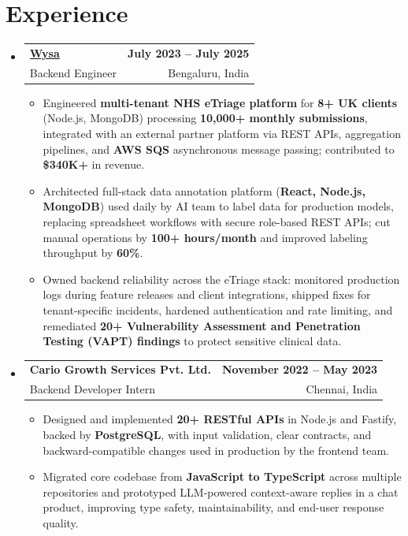 \documentclass[letterpaper,10pt]{article}
\makeatletter
\newcommand{\resumeItem}[1]{
  \item\small{#1\vspace{-1pt}}
}
\newcommand{\resumeSubheading}[4]{
  \vspace{1pt}\item
    \begin{tabular*}{0.985\textwidth}[t]{l@{\extracolsep{\fill}}r}
      \textbf{#1} & \textbf{\small #2} \\
      {\small\color{ResumeSlate} #3} & {\small\color{ResumeSlate} #4} \\
    \end{tabular*}\vspace{-6pt}
}
\newcommand{\resumeSubHeadingListStart}{\begin{itemize}[leftmargin=0.0in, label={}, itemsep=2pt, topsep=2pt]}
\newcommand{\resumeSubHeadingListEnd}{\end{itemize}}
\newcommand{\resumeItemListStart}{\begin{itemize}[leftmargin=0.18in, itemsep=2pt, topsep=1pt]}
\newcommand{\resumeItemListEnd}{\end{itemize}\vspace{-4pt}}
\makeatother
\begin{document}
\section{Experience}
\resumeSubHeadingListStart
  \resumeSubheading
    {\href{https://www.wysa.io}{Wysa}}{July 2023 -- July 2025}
    {Backend Engineer}{Bengaluru, India}
    \resumeItemListStart
      \resumeItem{Engineered \textbf{multi-tenant NHS eTriage platform} for \textbf{8+ UK clients} (Node.js, MongoDB) processing \textbf{10{,}000+ monthly submissions}, integrated with an external partner platform via REST APIs, aggregation pipelines, and \textbf{AWS SQS} asynchronous message passing; contributed to \textbf{\$340K+} in revenue.}
      \resumeItem{Architected full-stack data annotation platform (\textbf{React, Node.js, MongoDB}) used daily by AI team to label data for production models, replacing spreadsheet workflows with secure role-based REST APIs; cut manual operations by \textbf{100+ hours/month} and improved labeling throughput by \textbf{60\%}.}
      \resumeItem{Owned backend reliability across the eTriage stack: monitored production logs during feature releases and client integrations, shipped fixes for tenant-specific incidents, hardened authentication and rate limiting, and remediated \textbf{20+ Vulnerability Assessment and Penetration Testing (VAPT) findings} to protect sensitive clinical data.}
    \resumeItemListEnd
  \resumeSubheading
    {Cario Growth Services Pvt. Ltd.}{November 2022 -- May 2023}
    {Backend Developer Intern}{Chennai, India}
    \resumeItemListStart
      \resumeItem{Designed and implemented \textbf{20+ RESTful APIs} in Node.js and Fastify, backed by \textbf{PostgreSQL}, with input validation, clear contracts, and backward-compatible changes used in production by the frontend team.}
      \resumeItem{Migrated core codebase from \textbf{JavaScript to TypeScript} across multiple repositories and prototyped LLM-powered context-aware replies in a chat product, improving type safety, maintainability, and end-user response quality.}
    \resumeItemListEnd
\resumeSubHeadingListEnd
\vspace{-4pt}
\end{document}
